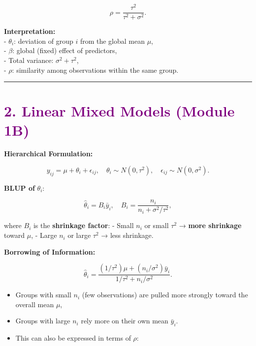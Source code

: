 \documentclass[
  letterpaper,
  DIV=11,
  numbers=noendperiod]{scrreprt}
\begin{document}
\[
  \rho = \frac{\tau^2}{\tau^2 + \sigma^2}.
\]

\textbf{Interpretation:}\\
- \(\theta_i\): deviation of group \(i\) from the global mean \(\mu\),\\
- \(\beta\): global (fixed) effect of predictors,\\
- Total variance: \(\sigma^2 + \tau^2\),\\
- \(\rho\): similarity among observations within the same group.

\begin{center}\rule{0.5\linewidth}{0.5pt}\end{center}

\hypertarget{section-4}{%
\section*{\texorpdfstring{\textcolor{purple}{2. Linear Mixed Models (Module 1B)}}{}}\label{section-4}}

\markright{\textcolor{purple}{2. Linear Mixed Models (Module 1B)}}

\textbf{Hierarchical Formulation:}

\[
y_{ij} = \mu + \theta_i + \epsilon_{ij}, \quad
\theta_i \sim N(0, \tau^2), \quad
\epsilon_{ij} \sim N(0, \sigma^2).
\]

\textbf{BLUP of} \(\theta_i\):

\[
\hat{\theta}_i = B_i \bar{y}_i, \quad
B_i = \frac{n_i}{n_i + \sigma^2 / \tau^2},
\]

where \(B_i\) is the \textbf{shrinkage factor}: - Small \(n_i\) or small
\(\tau^2\) → \textbf{more shrinkage} toward \(\mu\), - Large \(n_i\) or
large \(\tau^2\) → less shrinkage.

\textbf{Borrowing of Information:}

\[
\hat{\theta}_i =
\frac{(1/\tau^2)\mu + (n_i/\sigma^2)\bar{y}_i}{1/\tau^2 + n_i/\sigma^2}.
\]

\begin{itemize}
\item
  Groups with small \(n_i\) (few observations) are pulled more strongly
  toward the overall mean \(\mu\),
\item
  Groups with large \(n_i\) rely more on their own mean \(\bar{y}_i\).
\item
  This can also be expressed in terms of \(\rho\):
\end{itemize}
\end{document}
